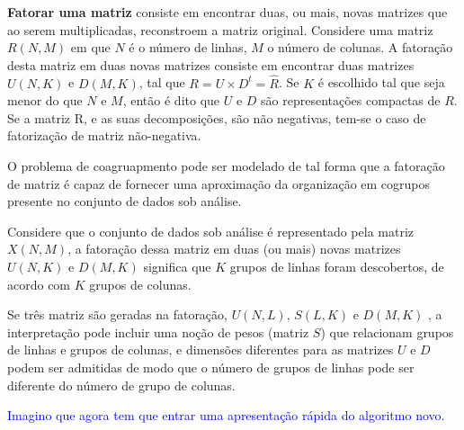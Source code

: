 \documentclass[
    12pt,                %
    oneside,            %
    a4paper,            %
    english,            %
    brazil                %
    ]{abntex2ppgsi}
\begin{document}
\textbf{Fatorar uma matriz} consiste em encontrar duas, ou mais, novas matrizes que ao serem multiplicadas, reconstroem a matriz original. Considere uma matriz $R(N,M)$ em que $N$ é o número de linhas, $M$ o número de colunas. A fatoração desta matriz em duas novas matrizes consiste em encontrar duas matrizes $U(N,K)$ e $D(M,K)$, tal que $ R = U \times D^t = \hat{R} $. Se $K$ é escolhido tal que seja menor do que $N$ e $M$, então é dito que $U$ e $D$ são representações compactas de $R$. Se a matriz R, e as suas decomposições, são não negativas, tem-se o caso de  fatorização de matriz não-negativa.


O problema de coagruapmento pode ser modelado de tal forma que a fatoração de matriz é capaz de fornecer uma aproximação da organização em cogrupos presente no conjunto de dados sob análise.

Considere que o conjunto de dados sob análise é representado pela matriz $X(N,M)$, a fatoração dessa matriz em duas (ou mais) novas matrizes $U(N,K)$ e $D(M,K)$ significa que $K$ grupos de linhas foram descobertos, de acordo com $K$ grupos de colunas.


Se três matriz são geradas na fatoração, $U(N,L)$, $S(L,K)$ e $D(M,K)$ , a interpretação pode incluir uma noção de pesos (matriz $S$) que relacionam grupos de linhas e grupos de colunas, e dimensões diferentes para as matrizes $U$ e $D$ podem ser admitidas de modo que o número de grupos de linhas pode ser diferente do número de grupo de colunas.


\textcolor{blue}{Imagino que agora tem que entrar uma apresentação rápida do algoritmo novo.}



\end{document}

